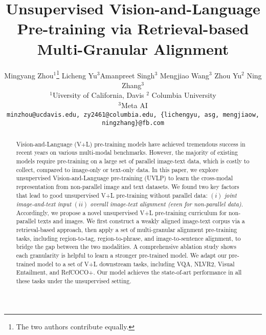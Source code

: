 \documentclass[10pt,twocolumn,letterpaper]{article}
\def\TaskName{UVLP}
\begin{document}
\title{Unsupervised Vision-and-Language Pre-training via Retrieval-based Multi-Granular Alignment} 

\author{
Mingyang Zhou$^1$\thanks{The two authors contribute equally.} \quad Licheng Yu$^3$\footnotemark[1]  \quad  Amanpreet Singh$^3$  \quad  Mengjiao Wang$^3$  \quad  Zhou Yu$^2$  \quad  Ning Zhang$^3$
\\ 
$^1$Uiversity of California, Davis   \quad  $^2$ Columbia University  \\  $^3$Meta AI\\
\tt{\small minzhou@ucdavis.edu}, \tt{\small zy2461@columbia.edu}, \tt{\small\{lichengyu, asg, mengjiaow, ningzhang\}@fb.com} \\
}

\maketitle

\begin{abstract}
Vision-and-Language (V+L) pre-training models have achieved tremendous success in recent years on various multi-modal benchmarks.
However, the majority of existing models require pre-training on a large set of parallel image-text data, which is costly to collect, compared to image-only or text-only data.
In this paper, we explore unsupervised Vision-and-Language pre-training (\TaskName) to learn the cross-modal representation from non-parallel image and text datasets. 
We found two key factors that lead to good unsupervised V+L pre-training without parallel data:  $(i)$ \textit{joint image-and-text input} $(ii)$ \textit{overall image-text alignment (even for non-parallel data)}. 
Accordingly, we propose a novel unsupervised V+L pre-training curriculum for non-parallel texts and images. 
We first construct a weakly aligned image-text corpus via a retrieval-based approach, then apply a set of multi-granular alignment pre-training tasks, including region-to-tag, region-to-phrase, and image-to-sentence alignment, to bridge the gap between the two modalities.
A comprehensive ablation study shows each granularity is helpful to learn a stronger pre-trained model.
We adapt our pre-trained model to a set of V+L downstream tasks, including VQA, NLVR2, Visual Entailment, and RefCOCO+. 
Our model achieves the state-of-art performance in all these tasks under the unsupervised setting.
\end{abstract}





\end{document}
